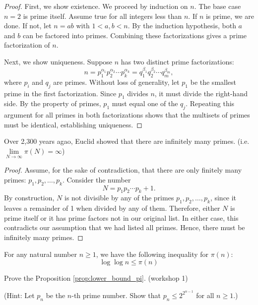 \documentclass{elegantbook}
\begin{document}
\begin{proof}
  First, we show existence. We proceed by induction on $n$. The base case $n=2$ is prime itself. Assume true for all integers less than $n$. If $n$ is prime, we are done. If not, let $n = ab$ with $1 < a, b < n$. By the induction hypothesis, both $a$ and $b$ can be factored into primes. Combining these factorizations gives a prime factorization of $n$.

  Next, we show uniqueness. Suppose $n$ has two distinct prime factorizations:
  \[
    n = p_1^{\alpha_1} p_2^{\alpha_2} \cdots p_k^{\alpha_k} = q_1^{\beta_1} q_2^{\beta_2} \cdots q_m^{\beta_m},
  \]
  where $p_i$ and $q_j$ are primes. Without loss of generality, let $p_1$ be the smallest prime in the first factorization. Since $p_1$ divides $n$, it must divide the right-hand side. By the property of primes, $p_1$ must equal one of the $q_j$. Repeating this argument for all primes in both factorizations shows that the multisets of primes must be identical, establishing uniqueness.
\end{proof}

\begin{theorem}
  Over 2,300 years agao, Euclid showed that there are infinitely many primes. (i.e. $\lim\limits_{N \to \infty} \pi(N) = \infty$)
\end{theorem}

\begin{proof}
  Assume, for the sake of contradiction, that there are only finitely many primes: $p_1, p_2, \ldots, p_k$. Consider the number
  \[
    N = p_1 p_2 \cdots p_k + 1.
  \]
  By construction, $N$ is not divisible by any of the primes $p_1, p_2, \ldots, p_k$, since it leaves a remainder of 1 when divided by any of them. Therefore, either $N$ is prime itself or it has prime factors not in our original list. In either case, this contradicts our assumption that we had listed all primes. Hence, there must be infinitely many primes.
\end{proof}

\begin{proposition} \label{prop:lower_bound_pi}
    For any natural number $n \geq 1$, we have the following inequality for $\pi(n)$:
    \[
      \log \log n \leq \pi(n)
    \]
\end{proposition}

\begin{exercise}
  Prove the Proposition \ref{prop:lower_bound_pi}. (workshop 1)

  \qquad\quad (Hint: Let $p_n$ be the $n$-th prime number. Show that $p_n \leq 2^{2^{n-1}}$ for all $n \geq 1$.)
\end{exercise}
\end{document}
